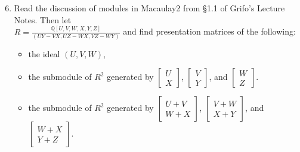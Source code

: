 \documentclass[12pt]{amsart}
\newcommand{\Q}{\mathbb{Q}}
\begin{document}
\begin{enumerate}\setcounter{enumi}{5}


\item  Read the discussion of modules in Macaulay2 from \S1.1 of Grifo's Lecture Notes. Then let \\ $\displaystyle{R=\frac{\Q[U,V, W , X , Y , Z]}{(UY-VX,UZ-WX,VZ-WY)}}$ and find presentation matrices of the following:
\begin{itemize}
\item the ideal $(U,V,W)$,
\item the submodule of $R^2$ generated by $\begin{bmatrix} U \\ X \end{bmatrix}$, $\begin{bmatrix} V \\ Y \end{bmatrix}$, and $\begin{bmatrix} W \\ Z \end{bmatrix}$.
\item the submodule of $R^2$ generated by $\begin{bmatrix} U +V \\ W+X \end{bmatrix}$, $\begin{bmatrix} V+W \\ X+Y \end{bmatrix}$, and $\begin{bmatrix} W+X \\ Y+Z \end{bmatrix}$.
\end{itemize}
\end{enumerate}
\end{document}
